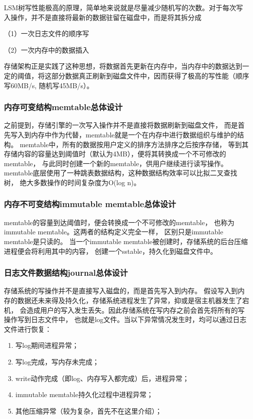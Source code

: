 		LSM树写性能极高的原理，简单地来说就是尽量减少随机写的次数。对于每次写入操作，并不是直接将最新的数据驻留在磁盘中，而是将其拆分成
		
		（1）{一次日志文件的顺序写}

		（2）{一次内存中的数据插入}

		存储架构正是实践了这种思想，将数据首先更新在内存中，当内存中的数据达到一定的阈值，将这部分数据真正刷新到磁盘文件中，因而获得了极高的写性能（顺序写60MB/s, 随机写45MB/s）。

		\subsubsection{内存可变结构memtable总体设计}
		
		之前提到，存储引擎的一次写入操作并不是直接将数据刷新到磁盘文件，
		而是首先写入到内存中作为代替，memtable就是一个在内存中进行数据组织与维护的结构。
		memtable中，所有的数据按用户定义的排序方法排序之后按序存储，
		等到其存储内容的容量达到阈值时（默认为4MB），便将其转换成一个不可修改的memtable，
		与此同时创建一个新的memtable，供用户继续进行读写操作。
		memtable底层使用了一种跳表数据结构，这种数据结构效率可以比拟二叉查找树，
		绝大多数操作的时间复杂度为O(log n)。

		\subsubsection{内存不可变结构immutable memtable总体设计}

		memtable的容量到达阈值时，便会转换成一个不可修改的memtable，
		也称为immutable memtable。这两者的结构定义完全一样，
		区别只是immutable memtable是只读的。
		当一个immutable memtable被创建时，存储系统的后台压缩进程便会将利用其中的内容，
		创建一个sstable，持久化到磁盘文件中。

		\subsubsection{日志文件数据结构journal总体设计}

		存储系统的写操作并不是直接写入磁盘的，而是首先写入到内存。
		假设写入到内存的数据还未来得及持久化，存储系统进程发生了异常，抑或是宿主机器发生了宕机，
		会造成用户的写入发生丢失。因此存储系统在写内存之前会首先将所有的写操作写到日志文件中，
		也就是log文件。当以下异常情况发生时，均可以通过日志文件进行恢复：

		\begin{enumerate}
			\item 写log期间进程异常；
			\item 写log完成，写内存未完成；
			\item write动作完成（即log、内存写入都完成）后，进程异常；
			\item immutable memtable持久化过程中进程异常；
			\item 其他压缩异常（较为复杂，首先不在这里介绍）；
		\end{enumerate}
	
